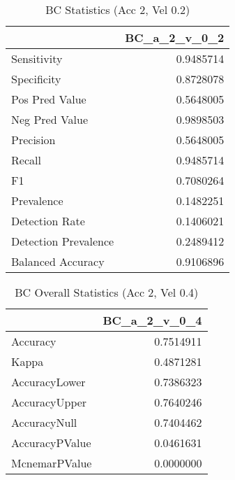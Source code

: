 \documentclass[]{article}
\begin{document}
\begin{table}[!h]

\caption{\label{tab:bc_accuracy_chunk}BC Statistics (Acc 2, Vel 0.2)}
\centering
\begin{tabular}[t]{lr}
\toprule
  & BC\_a\_2\_v\_0\_2\\
\midrule
Sensitivity & 0.9485714\\
Specificity & 0.8728078\\
Pos Pred Value & 0.5648005\\
Neg Pred Value & 0.9898503\\
Precision & 0.5648005\\
\addlinespace
Recall & 0.9485714\\
F1 & 0.7080264\\
Prevalence & 0.1482251\\
Detection Rate & 0.1406021\\
Detection Prevalence & 0.2489412\\
Balanced Accuracy & 0.9106896\\
\bottomrule
\end{tabular}
\end{table}

\begin{table}[!h]

\caption{\label{tab:bc_accuracy_chunk}BC Overall Statistics (Acc 2, Vel 0.4)}
\centering
\begin{tabular}[t]{lr}
\toprule
  & BC\_a\_2\_v\_0\_4\\
\midrule
Accuracy & 0.7514911\\
Kappa & 0.4871281\\
AccuracyLower & 0.7386323\\
AccuracyUpper & 0.7640246\\
AccuracyNull & 0.7404462\\
\addlinespace
AccuracyPValue & 0.0461631\\
McnemarPValue & 0.0000000\\
\bottomrule
\end{tabular}
\end{table}
\end{document}
